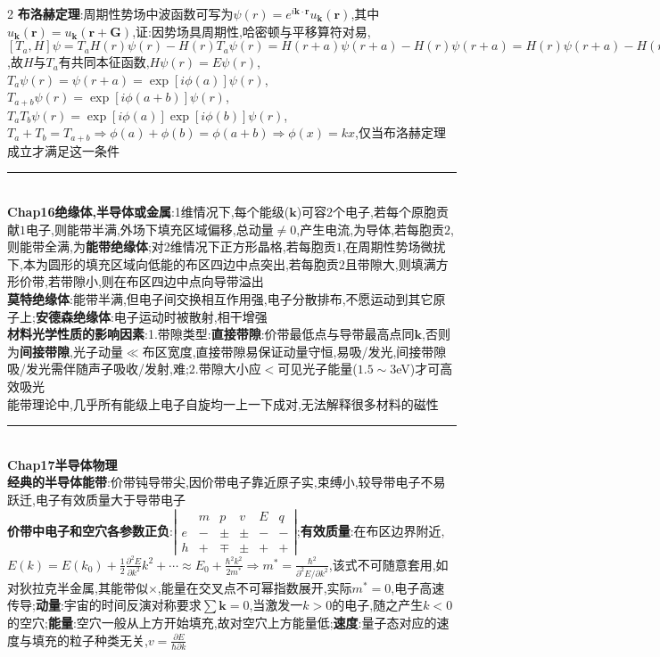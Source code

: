 \documentclass[UTF8,10pt,a4paper]{article}
\begin{document}
\begin{multicols}{2}
\textbf{布洛赫定理}:周期性势场中波函数可写为$\psi(r)=e^{i\bm{k}\cdot\bm{r}}u_{\bm{k}}(\bm{r})$,其中$u_{\bm{k}}(\bm{r})=u_{\bm{k}}(\bm{r}+\bm{G})$,证:因势场具周期性,哈密顿与平移算符对易,$[T_a,H]\psi=T_aH(r)\psi(r)-H(r)T_a\psi(r)=H(r+a)\psi(r+a)-H(r)\psi(r+a)=H(r)\psi(r+a)-H(r)\psi(r+a)=0\Rightarrow[T_a,H]=0$,故$H$与$T_a$有共同本征函数,$H\psi(r)=E\psi(r)$,$T_a\psi(r)=\psi(r+a)=\exp[i\phi(a)]\psi(r)$,$T_{a+b}\psi(r)=\exp[i\phi(a+b)]\psi(r)$,$T_aT_b\psi(r)=\exp[i\phi(a)]\exp[i\phi(b)]\psi(r)$,$T_a+T_b=T_{a+b}\Rightarrow\phi(a)+\phi(b)=\phi(a+b)\Rightarrow\phi(x)=kx$,仅当布洛赫定理成立才满足这一条件\\
\rule{\columnwidth}{.2pt}\\
\textbf{Chap16绝缘体,半导体或金属}:1维情况下,每个能级($\bm{k}$)可容$2$个电子,若每个原胞贡献$1$电子,则能带半满,外场下填充区域偏移,总动量$\neq 0$,产生电流,为导体,若每胞贡$2$,则能带全满,为\textbf{能带绝缘体};对2维情况下正方形晶格,若每胞贡$1$,在周期性势场微扰下,本为圆形的填充区域向低能的布区四边中点突出,若每胞贡$2$且带隙大,则填满方形价带,若带隙小,则在布区四边中点向导带溢出\\
\textbf{莫特绝缘体}:能带半满,但电子间交换相互作用强,电子分散排布,不愿运动到其它原子上;\textbf{安德森绝缘体}:电子运动时被散射,相干增强\\
\textbf{材料光学性质的影响因素}:1.带隙类型:\textbf{直接带隙}:价带最低点与导带最高点同$\bm{k}$,否则为\textbf{间接带隙},光子动量$\ll$布区宽度,直接带隙易保证动量守恒,易吸/发光,间接带隙吸/发光需伴随声子吸收/发射,难;2.带隙大小应$<$可见光子能量($1.5\sim 3$eV)才可高效吸光\\
能带理论中,几乎所有能级上电子自旋均一上一下成对,无法解释很多材料的磁性\\
\rule{\columnwidth}{.2pt}\\
\textbf{Chap17半导体物理}\\
\textbf{经典的半导体能带}:价带钝导带尖,因价带电子靠近原子实,束缚小,较导带电子不易跃迁,电子有效质量大于导带电子\\
\textbf{价带中电子和空穴各参数正负}:$\left\lvert\begin{smallmatrix}
    &m&p&v&E&q\\
    e&-&\pm&\pm&-&-\\
    h&+&\mp&\pm&+&+
\end{smallmatrix}\right\rvert$;\textbf{有效质量}:在布区边界附近,$E(k)=E(k_0)+\frac{1}{2}\frac{\partial^2E}{\partial k^2}k^2+\cdots\approx E_0+\frac{\hbar^2k^2}{2m^*}\Rightarrow m^*=\frac{\hbar^2}{\partial^2E/\partial k^2}$,该式不可随意套用,如对狄拉克半金属,其能带似$\times$,能量在交叉点不可幂指数展开,实际$m^*=0$,电子高速传导;\textbf{动量}:宇宙的时间反演对称要求$\sum\bm{k}=0$,当激发一$k>0$的电子,随之产生$k<0$的空穴;\textbf{能量}:空穴一般从上方开始填充,故对空穴上方能量低;\textbf{速度}:量子态对应的速度与填充的粒子种类无关,$v=\frac{\partial E}{\hbar\partial k}$\\

\end{multicols}
\end{document}

